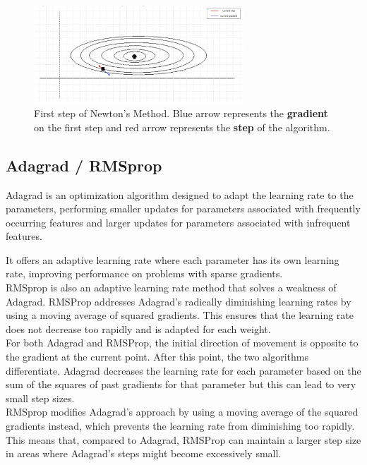 \begin{figure}[htpb]
	\centering
	\includegraphics[width=0.7\textwidth]{../Problem 9/contour_newtons.png}
		\caption{First step of Newton's Method. Blue arrow represents the \textbf{gradient} on the first step and red arrow represents the \textbf{step} of the algorithm.}
	\label{fig:prob9_contour_newtons}
\end{figure}

\subsection{Adagrad / RMSprop}

Adagrad is an optimization algorithm designed to adapt the learning rate to the parameters, performing smaller updates for parameters associated with frequently occurring features and larger updates for parameters associated with infrequent features. 

It offers an adaptive learning rate where each parameter has its own learning rate, improving performance on problems with sparse gradients. \\

RMSprop is also an adaptive learning rate method that solves a weakness of Adagrad. RMSProp addresses Adagrad's radically diminishing learning rates by using a moving average of squared gradients. This ensures that the learning rate does not decrease too rapidly and is adapted for each weight.\\

For both Adagrad and RMSProp, the initial direction of movement is opposite to the gradient at the current point. After this point, the two algorithms differentiate. Adagrad decreases the learning rate for each parameter based on the sum of the squares of past gradients for that parameter but this can lead to very small step sizes.\\

RMSprop modifies Adagrad's approach by using a moving average of the squared gradients instead, which prevents the learning rate from diminishing too rapidly. This means that, compared to Adagrad, RMSProp can maintain a larger step size in areas where Adagrad's steps might become excessively small.

